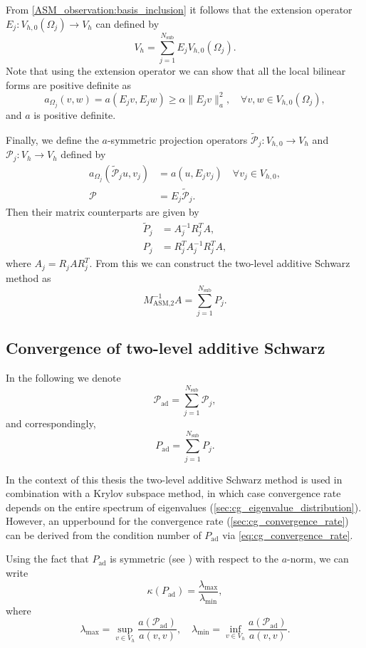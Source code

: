 From \cref{ASM_observation:basis_inclusion} it follows that the extension operator $E_j: V_{h,0}(\Omega_j) \rightarrow V_h$ can defined by 
\[
    V_h = \sum_{j=1}^{N_{\text{sub}}} E_j V_{h,0}(\Omega_j).
\] 
Note that using the extension operator we can show that all the local bilinear forms are positive definite as
\[
    a_{\Omega_j}(v,w) = a(E_j v, E_j w) \geq \alpha \| E_j v \|_a^2, \quad \forall v,w\in V_{h,0}(\Omega_j),
\]
and $a$ is positive definite. 

Finally, we define the $a$-symmetric projection operators $\tilde{\mathcal{P}}_j: V_{h,0} \rightarrow V_h$ and $\mathcal{P}_j:V_h \rightarrow V_h$ defined by 
\begin{align*}
    a_{\Omega_j}(\tilde{\mathcal{P}}_j u, v_j) &= a(u, E_j v_j) \quad \forall v_j \in V_{h,0},\\
    \mathcal{P} &= E_j \tilde{\mathcal{P}}_j.
\end{align*}
Then their matrix counterparts are given by 
\begin{align*}
    \tilde{P}_j &=  A_j^{-1} R_j^T A,\\
    P_j &= R_j^T A_j^{-1} R_j^T A,
\end{align*}
where $A_j = R_j A R_j^T$. From this we can construct the two-level additive Schwarz method as
\begin{equation}
    M_{\text{ASM,2}}^{-1} A = \sum_{j=1}^{N_{\text{sub}}} P_j.
    \label{eq:two_level_ASM_projections}
\end{equation}

\subsection{Convergence of two-level additive Schwarz}\label{sec:two_level_ASM_convergence}
In the following we denote
\[
    \mathcal{P}_{\text{ad}} = \sum_{j=1}^{N_{\text{sub}}} \mathcal{P}_j,
\]
and correspondingly,
\[
    P_{\text{ad}} = \sum_{j=1}^{N_{\text{sub}}} P_j.
\]

In the context of this thesis the two-level additive Schwarz method is used in combination with a Krylov subspace method, in which case convergence rate depends on the entire spectrum of eigenvalues (\cref{sec:cg_eigenvalue_distribution}). However, an upperbound for the convergence rate (\cref{sec:cg_convergence_rate}) can be derived from the condition number of $P_{\text{ad}}$ via \cref{eq:cg_convergence_rate}. 

Using the fact that $P_{\text{ad}}$ is symmetric (see \cite[Lemma 5.8]{schwarz_methods_Dolean_2015}) with respect to the $a$-norm, we can write
\[
    \kappa(P_{\text{ad}}) = \frac{\lambda_{\text{max}}}{\lambda_{\text{min}}},
\]
where
\[
    \lambda_{\text{max}} = \sup_{v\in V_h} \frac{a(\mathcal{P}_{\text{ad}})}{a(v,v)}, \quad \lambda_{\text{min}} = \inf_{v\in V_h} \frac{a(\mathcal{P}_{\text{ad}})}{a(v,v)}.
\]

